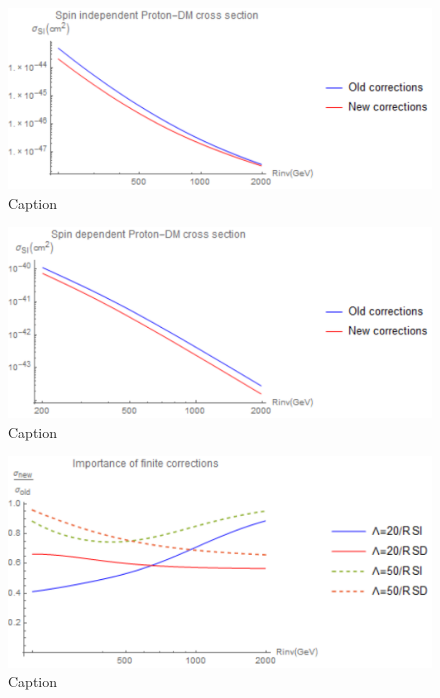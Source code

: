 \documentclass{article}
\begin{document}
 
\begin{figure}[H]
    \centering
    \includegraphics{SImasshow12.pdf}
    \caption{Caption}
    \label{simasshow12}
\end{figure}
\begin{figure}[H]
    \centering
    \includegraphics{SDmasshow12.pdf}
    \caption{Caption}
    \label{sdmasshow12}
\end{figure}
\begin{figure}[H]
    \centering
    \includegraphics{relimp.pdf}
    \caption{Caption}
    \label{relimp}
\end{figure}
\end{document}
